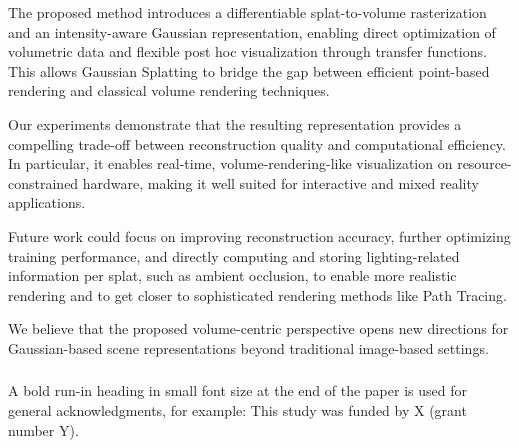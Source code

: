 \documentclass[runningheads]{llncs}
\begin{document}
The proposed method introduces a differentiable splat-to-volume rasterization and an intensity-aware Gaussian representation, enabling direct optimization of volumetric data and flexible post hoc visualization through transfer functions. This allows Gaussian Splatting to bridge the gap between efficient point-based rendering and classical volume rendering techniques.

Our experiments demonstrate that the resulting representation provides a compelling trade-off between reconstruction quality and computational efficiency. In particular, it enables real-time, volume-rendering-like visualization on resource-constrained hardware, making it well suited for interactive and mixed reality applications.

Future work could focus on improving reconstruction accuracy, further optimizing training performance, and directly computing and storing lighting-related information per splat, such as ambient occlusion, to enable more realistic rendering and to get closer to sophisticated rendering methods like Path Tracing.

We believe that the proposed volume-centric perspective opens new directions for Gaussian-based scene representations beyond traditional image-based settings.

\begin{credits}
\subsubsection{\ackname} A bold run-in heading in small font size at the end of the paper is
used for general acknowledgments, for example: This study was funded
by X (grant number Y).

\end{credits}





\end{document}
